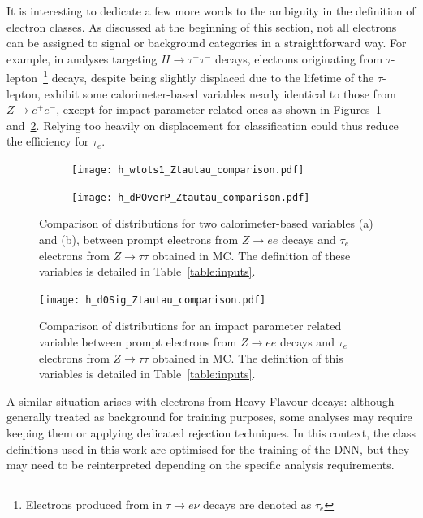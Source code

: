 It is interesting to dedicate a few more words to the ambiguity in the definition of electron classes. As discussed at the beginning of this section, not all electrons can be assigned to signal or background categories in a straightforward way. For example, in analyses targeting $H \rightarrow \tau^+\tau^-$ decays, electrons originating from $\tau$-lepton~\footnote{Electrons produced from in $\tau \to e \nu$ decays are denoted as $\tau_{e}$} decays, despite being slightly displaced due to the lifetime of the $\tau$-lepton, exhibit some calorimeter-based variables nearly identical to those from $Z \rightarrow e^{+}e^{-}$, except for impact parameter-related ones as shown in Figures~\ref{fig:compare} and~\ref{fig:compare2}. Relying too heavily on displacement for classification could thus reduce the efficiency for $\tau_e$. 
\begin{figure}[htbp]
  \centering
  \begin{subfigure}[b]{0.495\textwidth}
      \texttt{[image: h\_wtots1\_Ztautau\_comparison.pdf]}
      \caption{}
  \end{subfigure}
  \begin{subfigure}[b]{0.495\textwidth}
      \texttt{[image: h\_dPOverP\_Ztautau\_comparison.pdf]}
      \caption{}
  \end{subfigure}
  \caption{Comparison of distributions for two calorimeter-based variables (a) and (b), between prompt electrons from $Z \rightarrow ee$ decays and $\tau_{e}$ electrons from $Z \rightarrow \tau\tau$ obtained in MC. The definition of these variables is detailed in Table~\ref{table:inputs}.}
  \label{fig:compare}
\end{figure}


\begin{figure}[htbp]
  \centering
  \texttt{[image: h\_d0Sig\_Ztautau\_comparison.pdf]}
  \caption{Comparison of distributions for an impact parameter related variable between prompt electrons from $Z \rightarrow ee$ decays and $\tau_{e}$ electrons from $Z \rightarrow \tau\tau$ obtained in MC. The definition of this variables is detailed in Table~\ref{table:inputs}.}
  \label{fig:compare2}
\end{figure}
A similar situation arises with electrons from Heavy-Flavour decays: although generally treated as background for training purposes, some analyses may require keeping them or applying dedicated rejection techniques. In this context, the class definitions used in this work are optimised for the training of the DNN, but they may need to be reinterpreted depending on the specific analysis requirements.


